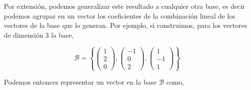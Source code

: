 \begin{paracol}{2}
Por extensión, podemos generalizar este resultado a cualquier otra base, es decir podemos agrupar en un vector los coeficientes de la combinación lineal de los vectores de la base que lo generan. Por ejemplo, si construimos, para los vectores de dimensión $3$ la base,
\end{paracol}

\begin{equation*}
\mathcal{B}=\left\lbrace \begin{pmatrix}
1\\
2\\
0
\end{pmatrix}, \begin{pmatrix}
-1\\
0\\
2
\end{pmatrix}, \begin{pmatrix}
1\\
-1\\
1
\end{pmatrix} \right\rbrace
\end{equation*} 
\begin{paracol}{2}
Podemos entonces representar un vector en la base $\mathcal{B}$ como,
\end{paracol}

